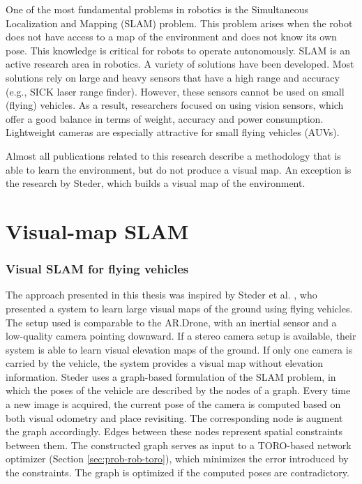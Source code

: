 One of the most fundamental problems in robotics is the Simultaneous Localization and Mapping (SLAM) problem.
This problem arises when the robot does not have access to a map of the environment and does not know its own pose. 
This knowledge is critical for robots to operate autonomously.
SLAM is an active research area in robotics.
A variety of solutions have been developed.
Most solutions rely on large and heavy sensors that have a high range and accuracy (e.g., SICK laser range finder).
However, these sensors cannot be used on small (flying) vehicles.
As a result, researchers focused on using vision sensors, which offer a good balance in terms of weight, accuracy and power consumption.
Lightweight cameras are especially attractive for small flying vehicles (AUVs).

Almost all publications related to this research describe a methodology that is able to learn the environment, but do not produce a visual map.
An exception is the research by Steder, which builds a visual map of the environment.


\section{Visual-map SLAM}

\subsubsection{Visual SLAM for flying vehicles}
\label{sec:realted-visual-slam-steder}
The approach presented in this thesis was inspired by Steder et al. \cite{steder2008visual}, who presented a system to learn large visual maps of the ground using flying vehicles.
The setup used is comparable to the AR.Drone, with an inertial sensor and a low-quality camera pointing downward.
If a stereo camera setup is available, their system is able to learn visual elevation maps of the ground.
If only one camera is carried by the vehicle, the system provides a visual map without elevation information.
Steder uses a graph-based formulation of the SLAM problem, in which the poses of the vehicle are described by the nodes of a graph.
Every time a new image is acquired, the current pose of the camera is computed based on both visual odometry and place revisiting.
The corresponding node is augment the graph accordingly.
Edges between these nodes represent spatial constraints between them.
The constructed graph serves as input to a TORO-based network optimizer (Section \ref{sec:prob-rob-toro}), which minimizes the error introduced by the constraints.
The graph is optimized if the computed poses are contradictory.

